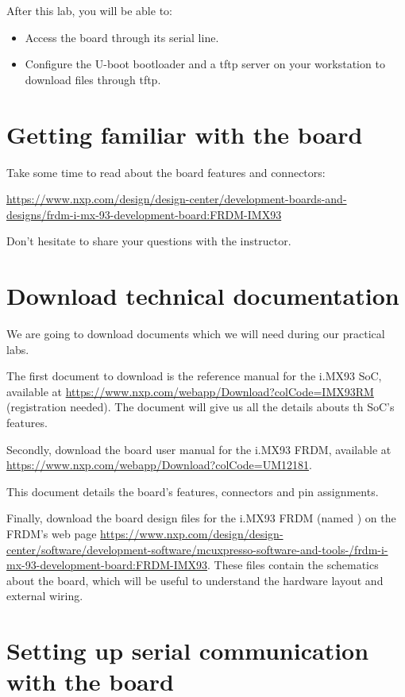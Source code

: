 
After this lab, you will be able to:
\begin{itemize}
\item Access the board through its serial line.
\item Configure the U-boot bootloader and a tftp server
      on your workstation to download files through tftp.
\end{itemize}

\section{Getting familiar with the board}

Take some time to read about the board features and connectors:

\url{https://www.nxp.com/design/design-center/development-boards-and-designs/frdm-i-mx-93-development-board:FRDM-IMX93}

Don't hesitate to share your questions with the instructor.

\section{Download technical documentation}

We are going to download documents which we will need during our
practical labs.

The first document to download is the reference manual for the
i.MX93 SoC, available at
\url{https://www.nxp.com/webapp/Download?colCode=IMX93RM} (registration needed). The document
will give us all the details abouts th SoC's features.

Secondly, download the board user manual for the i.MX93 FRDM, available at
\url{https://www.nxp.com/webapp/Download?colCode=UM12181}.

This document details the board's features, connectors and pin
assignments.

Finally, download the board design files for the i.MX93 FRDM
(named ) on the FRDM's web page
\url{https://www.nxp.com/design/design-center/software/development-software/mcuxpresso-software-and-tools-/frdm-i-mx-93-development-board:FRDM-IMX93}.
These files contain the schematics about the board, which will be
useful to understand the hardware layout and external wiring.

\section{Setting up serial communication with the board}

